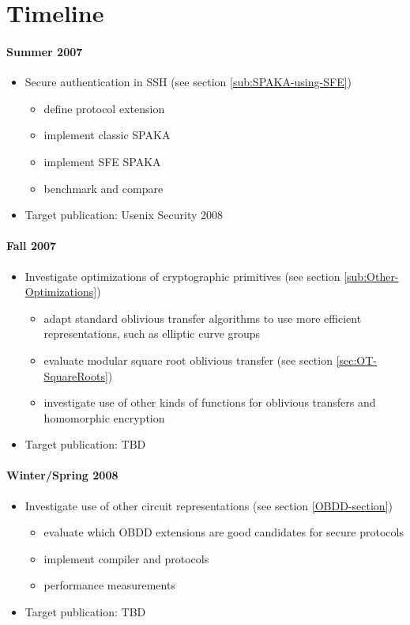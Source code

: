 
\part{Timeline}


\subsection{Summer 2007}
\begin{itemize}
\item Secure authentication in SSH (see section \ref{sub:SPAKA-using-SFE})

\begin{itemize}
\item define protocol extension
\item implement classic SPAKA 
\item implement SFE SPAKA
\item benchmark and compare
\end{itemize}
\item Target publication: Usenix Security 2008
\end{itemize}

\subsection{Fall 2007}
\begin{itemize}
\item Investigate optimizations of cryptographic primitives (see section
\ref{sub:Other-Optimizations})

\begin{itemize}
\item adapt standard oblivious transfer algorithms to use more efficient
representations, such as elliptic curve groups
\item evaluate modular square root oblivious transfer (see section \ref{sec:OT-SquareRoots})
\item investigate use of other kinds of functions for oblivious transfers
and homomorphic encryption
\end{itemize}
\item Target publication: TBD
\end{itemize}

\subsection{Winter/Spring 2008}
\begin{itemize}
\item Investigate use of other circuit representations (see section \ref{OBDD-section})

\begin{itemize}
\item evaluate which OBDD extensions are good candidates for secure protocols
\item implement compiler and protocols
\item performance measurements
\end{itemize}
\item Target publication: TBD
\end{itemize}

